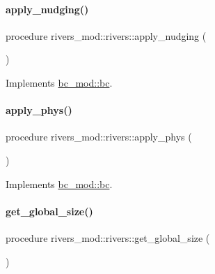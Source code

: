 \paragraph{\texorpdfstring{apply\+\_\+nudging()}{apply\_nudging()}}
{\footnotesize\ttfamily procedure rivers\+\_\+mod\+::rivers\+::apply\+\_\+nudging (\begin{DoxyParamCaption}{ }\end{DoxyParamCaption})\hspace{0.3cm}{\ttfamily [private]}}



Implements \mbox{\hyperlink{structbc__mod_1_1bc_a42dc448ba9e50fbb6b1acf03b0d121f3}{bc\+\_\+mod\+::bc}}.

\mbox{\label{structrivers__mod_1_1rivers_a4f6360b228319a4189289cafc2e3fd74}} 
\paragraph{\texorpdfstring{apply\+\_\+phys()}{apply\_phys()}}
{\footnotesize\ttfamily procedure rivers\+\_\+mod\+::rivers\+::apply\+\_\+phys (\begin{DoxyParamCaption}{ }\end{DoxyParamCaption})\hspace{0.3cm}{\ttfamily [private]}}



Implements \mbox{\hyperlink{structbc__mod_1_1bc_ad0d03ece320569369a296ff3d4cf10d2}{bc\+\_\+mod\+::bc}}.

\mbox{\label{structrivers__mod_1_1rivers_a51f0caa3611caf9a391fe5797f46c031}} 
\paragraph{\texorpdfstring{get\+\_\+global\+\_\+size()}{get\_global\_size()}}
{\footnotesize\ttfamily procedure rivers\+\_\+mod\+::rivers\+::get\+\_\+global\+\_\+size (\begin{DoxyParamCaption}{ }\end{DoxyParamCaption})\hspace{0.3cm}{\ttfamily [private]}}

